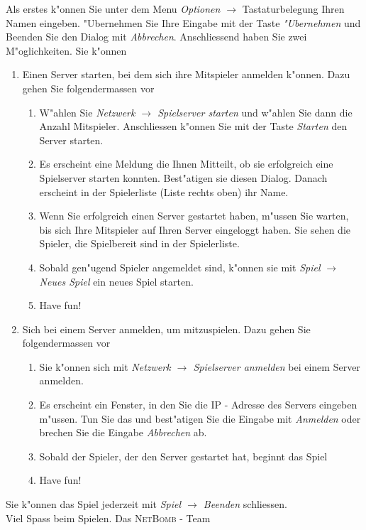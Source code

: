 		Als erstes k"onnen Sie unter dem Menu \textit{Optionen $\rightarrow$} Tastaturbelegung Ihren Namen eingeben.
		"Ubernehmen Sie Ihre Eingabe mit der Taste \textit{"Ubernehmen} und Beenden Sie den Dialog mit \textit{Abbrechen}.
		Anschliessend haben Sie zwei M"oglichkeiten. Sie k"onnen 
		\begin{enumerate}
			\item Einen Server starten, bei dem sich ihre Mitspieler anmelden k"onnen. Dazu gehen Sie folgendermassen vor
			\begin{enumerate}
				\item W"ahlen Sie  \textit{Netzwerk $\rightarrow$ Spielserver starten} und w"ahlen Sie dann die Anzahl Mitspieler.
							Anschliessen k"onnen Sie mit der Taste \textit{Starten} den Server starten.
				\item Es erscheint eine Meldung die Ihnen Mitteilt, ob sie erfolgreich eine Spielserver starten konnten. Best"atigen
							sie diesen Dialog. Danach erscheint in der Spielerliste (Liste rechts oben) ihr Name.
				\item Wenn Sie erfolgreich einen Server gestartet haben, m"ussen Sie warten, bis sich Ihre Mitspieler auf Ihren 
							Server eingeloggt haben. Sie sehen die Spieler, die Spielbereit sind in der Spielerliste.
				\item Sobald gen"ugend Spieler angemeldet sind, k"onnen sie mit \textit{Spiel $\rightarrow$ Neues Spiel} ein neues 
							Spiel starten.
				\item Have fun!
			\end{enumerate}
			\item Sich bei einem Server anmelden, um mitzuspielen. Dazu gehen Sie folgendermassen vor
			\begin{enumerate}
				\item Sie k"onnen sich mit \textit{Netzwerk $\rightarrow$ Spielserver anmelden} bei einem Server anmelden.
				\item	Es erscheint ein Fenster, in den Sie die IP - Adresse des Servers eingeben m"ussen. Tun Sie das und
							best"atigen Sie die Eingabe mit \textit{Anmelden} oder brechen Sie die Eingabe \textit{Abbrechen} ab.
				\item Sobald der Spieler, der den Server gestartet hat, beginnt das Spiel
				\item Have fun!
			\end{enumerate}
		\end{enumerate}

		
		\noindent
		Sie k"onnen das Spiel jederzeit mit \textit{Spiel $\rightarrow$ Beenden} schliessen. \\

		\noindent
		Viel Spass beim Spielen.
		Das \textsc{NetBomb} - Team
